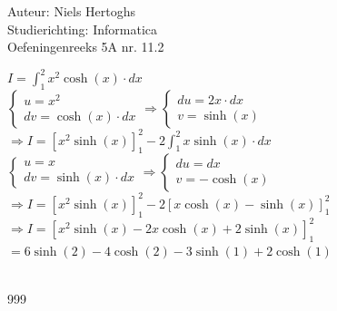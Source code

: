 \documentclass[a4paper]{article}
\begin{document}
\noindent \large Auteur: Niels Hertoghs \\
\noindent \large Studierichting:  Informatica\\
\noindent \large Oefeningenreeks 5A nr. 11.2\\

\medskip

\normalsize


$I = \displaystyle\int_{1}^{2} x^2  \cosh (x) \cdot dx $\\

$\left\{
    \begin{array}{l}
        u = x^2 \\
        dv = \cosh (x) \cdot dx
    \end{array}
\right .
\Rightarrow
\left\{
    \begin{array}{l}
        du =  2x \cdot dx \\
        v = \sinh (x)
    \end{array}
\right .$\\

$\Rightarrow I =  \left[ x^2 \sinh (x) \right]_{1}^{2} - 2 \displaystyle\int_{1}^{2}x  \sinh (x) \cdot dx $\\

$\left\{
    \begin{array}{l}
        u = x \\
        dv = \sinh (x) \cdot dx
    \end{array}
\right .
\Rightarrow
\left\{
    \begin{array}{l}
        du = dx \\
        v = - \cosh (x)
    \end{array}
\right .$\\

$\Rightarrow I =  \left[ x^2 \sinh (x) \right]_{1}^{2} - 2 \left [ x \cosh (x) - \sinh (x) \right ]_1^2$\\

$\Rightarrow I =  \left[ x^2 \sinh (x) - 2 x \cosh (x) + 2 \sinh (x) \right ]_1^2$\\

$= 6 \sinh (2) - 4 \cosh (2) - 3 \sinh (1) + 2 \cosh (1)$\\\



\begin{thebibliography}{999}
\end{thebibliography}
\end{document}
